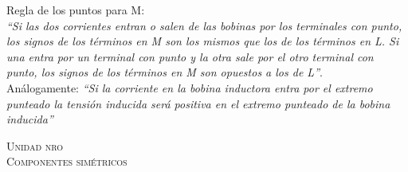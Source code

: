 \documentclass[11pt,a4paper,twocolumn]{article}
\newcommand{\unidad}[2]{\begin{center}
		\fontsize{10}{10}\selectfont\color{gray!50!black}\scshape Unidad #1 \\
		\fontsize{14}{14}\selectfont \scshape #2
\end{center} \vspace{-.6cm}}
\begin{document}
\begin{cajita}
Regla de los puntos para M:\\
\textit{``Si las dos corrientes entran o salen de las bobinas por los terminales con punto, los signos de los términos en M son los mismos que los de los términos en L. Si una entra por un terminal con punto y la otra sale por el otro terminal con punto, los signos de los términos en M son opuestos a los de L''}.\\
Análogamente: \textit{``Si la corriente en la bobina inductora entra por el extremo punteado la tensión inducida será positiva en el extremo punteado de la bobina inducida''}
	
\end{cajita}
\newpage
\unidad{nro}{Componentes simétricos}
\end{document}
